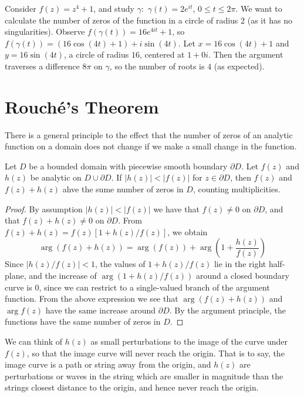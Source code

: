 \documentclass[12pt, a4paper, oneside, openright, titlepage]{book}
\begin{document}
\begin{eg}
    Consider $f(z) = z^4 + 1$, and study $\gamma:$ $\gamma(t) = 2e^{it}$, $0 \leq t \leq 2\pi$. We want to calculate the number of zeros of the function in a circle of radius $2$ (as it has no singularities). Observe $f(\gamma(t)) = 16e^{4it}+1$, so $f(\gamma(t)) = (16\cos(4t)+1)+i\sin(4t)$. Let $x = 16\cos(4t)+1$ and $y = 16\sin(4t)$, a circle of radius $16$, centered at $1+0i$. Then the argument traverses a difference $8\pi$ on $\gamma$, so the number of roots is $4$ (as expected).
\end{eg}





\section{Rouch\'{e}'s Theorem}

There is a general principle to the effect that the number of zeros of an analytic function on a domain does not change if we make a small change in the function. 

\begin{namthm}
    Let $D$ be a bounded domain with piecewise smooth boundary $\partial D$. Let $f(z)$ and $h(z)$ be analytic on $D\cup \partial D$. If $|h(z)| < |f(z)|$ for $z \in \partial D$, then $f(z)$ and $f(z)+h(z)$ ahve the sume number of zeros in $D$, counting multiplicities.
\end{namthm}
\begin{proof}
    By assumption $|h(z)| < |f(z)|$ we have that $f(z) \neq 0$ on $\partial D$, and that $f(z)+h(z) \neq 0$ on $\partial D$. From $f(z)+h(z) = f(z)[1+h(z)/f(z)]$, we obtain \begin{equation*}
        \arg(f(z)+h(z)) = \arg(f(z))+\arg\left(1+\frac{h(z)}{f(z)}\right)
    \end{equation*}
    Since $|h(z)/f(z)| < 1$, the values of $1+h(z)/f(z)$ lie in the right half-plane, and the increase of $\arg(1+h(z)/f(z))$ around a closed boundary curve is $0$, since we can restrict to a single-valued branch of the argument function. From the above expression we see that $\arg(f(z)+h(z))$ and $\arg f(z)$ have the same increase around $\partial D$. By the argument principle, the functions have the same number of zeros in $D$.
\end{proof}

We can think of $h(z)$ as small perturbations to the image of the curve under $f(z)$, so that the image curve will never reach the origin. That is to say, the image curve is a path or string away from the origin, and $h(z)$ are perturbations or waves in the string which are smaller in magnitude than the strings closest distance to the origin, and hence never reach the origin.
\end{document}
